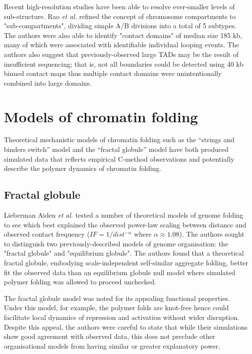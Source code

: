 \documentclass[a4paper,10pt,oneside]{book}
\begin{document}
Recent high-resolution studies have been able to resolve ever-smaller levels of sub-structure. Rao \emph{et al.}\cite{Rao2014} refined the concept of chromosome compartments to "sub-compartments", dividing simple A/B divisions into a total of 5 subtypes. The authors were also able to identify "contact domains" of median size 185 kb, many of which were associated with identifiable individual looping events.\cite{Rao2014} The authors also suggest that previously-observed large TADs may be the result of insufficient sequencing; that is, not all boundaries could be detected using 40 kb binned contact maps thus multiple contact domains were unintentionally combined into large domains.

\section{Models of chromatin folding}

Theoretical mechanistic models of chromatin folding such as the
``strings and binders switch'' model\cite{Barbieri2012} and the ``fractal
globule'' model\cite{Lieberman2009, Mirny2011, Grosberg1988a} have both produced simulated data
that reflects empirical C-method observations and potentially describe the polymer
dynamics of chromatin folding.

\subsection{Fractal globule}
Lieberman Aiden \emph{ et al.}\cite{Lieberman2009} tested a number of theoretical models of genome folding to see which best explained the observed power-law scaling between distance and observed contact frequency ($IF =  1 / dist^{-\alpha}$ where $\alpha \approx 1.08$).  The authors sought to distinguish two previously-described models of genome organisation: the "fractal globule" and "equilibrium globule". The authors found that a theoretical fractal globule, embodying scale-independent self-similar aggregate folding, better fit the observed data than an equilibrium globule null model where simulated polymer folding was allowed to proceed unchecked.


The fractal globule model was noted for its appealing functional properties. Under this model, for example, the polymer folds are knot-free hence could facilitate local dynamics of repression and activation without wider disruption. Despite this appeal, the authors were careful to state that while their simulations show good agreement with observed data, this does not preclude other organisational models from having similar or greater explanatory power.\cite{Lieberman2009}
\end{document}
